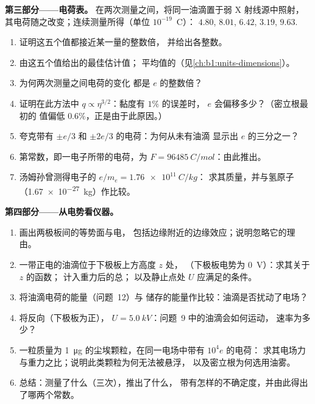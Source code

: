 \begin{problem}
\medskip
\noindent\textbf{第三部分——电荷表。}
在两次测量之间，将同一油滴置于弱 X 射线源中照射，
其电荷随之改变；连续测量所得（单位 $10^{-19}$~C）：
$4.80$, $8.01$, $6.42$, $3.19$, $9.63$.
\begin{enumerate}[resume]
  \item 证明这五个值都接近某一量的整数倍，
        并给出各整数。
  \item 由这五个值给出的最佳估计值；
        平均值的（见\cref{ch:b1:units-dimensions}）。
  \item 为何两次测量之间电荷的变化
        都是 $e$ 的整数倍？
  \item 证明在此方法中 $q \propto \eta^{3/2}$：黏度有 $1\%$ 的误差时，
        $e$ 会偏移多少？（密立根最初的
        值偏低 $0.6\%$，正是由于此原因。）
  \item 夸克带有 $\pm e/3$ 和 $\pm 2e/3$ 的电荷：为何从未有油滴
        显示出 $e$ 的三分之一？
  \item {}第常数，即一电子所带的电荷，为
        $F = \qty{96485}{C/mol}$：由此推出。
  \item 汤姆孙曾测得电子的 $e/m_e = \qty{1.76e11}{C/kg}$：
        求其质量，并与氢原子
        （\qty{1.67e-27}{kg}）作比较。
\end{enumerate}

\medskip
\noindent\textbf{第四部分——从电势看仪器。}
\begin{enumerate}[resume]
  \item 画出两极板间的等势面与电，
        包括边缘附近的边缘效应；说明忽略它的理由。
  \item 一带正电的油滴位于下极板上方高度 $z$ 处，
        （下极板电势为 \qty{0}{V}）：求其关于 $z$ 的函数；
        计入重力后的总；
        以及静止点处 $U$ 应满足的条件。
  \item 将油滴电荷的能量（问题~12）与
        储存的能量作比较：油滴是否扰动了电场？
  \item 将反向（下极板为正），
        $U = \qty{5.0}{kV}$：问题~9 中的油滴会如何运动，
        速率为多少？
  \item 一粒质量为 \qty{1}{\micro g} 的尘埃颗粒，在同一电场中带有 $10^4e$ 的电荷：
        求其电场力与重力之比；说明此类颗粒为何无法被悬浮，
        以及密立根为何选用油雾。
  \item 总结：测量了什么（三次），推出了什么，
        带有怎样的不确定度，并由此得出了哪两个常数。
\end{enumerate}
\end{problem}
